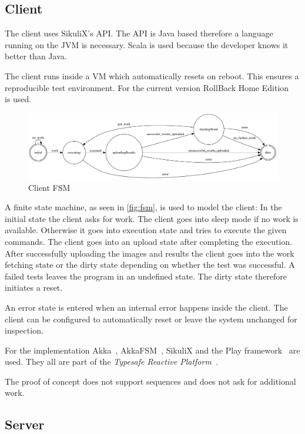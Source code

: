 \documentclass[a4paper,twocolumn,twoside]{article}
\begin{document}
\subsection{Client}
The client uses SikuliX's API.
The API is Java based therefore a language running on the JVM is necessary.
Scala is used because the developer knows it better than Java.

The client runs inside a VM which automatically resets on reboot.
This ensures a reproducible test environment.
For the current version RollBack Home Edition~\cite{RollBack} is used.
\begin{figure}
	\centering
	\includegraphics[width=1.0\linewidth]{../img/client_fsm}
	\caption{Client FSM}
	\label{fig:fsm}
\end{figure}
A finite state machine, as seen in \autoref{fig:fsm}, is used to model the client:
In the initial state the client asks for work.
The client goes into sleep mode if no work is available.
Otherwise it goes into execution state and tries to execute the given commands.
The client goes into an upload state after completing the execution.
After successfully uploading the images and results the client goes into the work fetching state or the dirty state depending on whether the test was successful.
A failed tests leaves the program in an undefined state.
The dirty state therefore initiates a reset.

An error state is entered when an internal error happens inside the client.
The client can be configured to automatically reset or leave the system unchanged for inspection.

For the implementation Akka~\cite{Akka}, AkkaFSM~\cite{AkkaFSM}, SikuliX and the Play framework~\cite{Play} are used.
They all are part of the \emph{Typesafe Reactive Platform}~\cite{TypesafeRP}.

The proof of concept does not support sequences and does not ask for additional work.

\subsection{Server}
\end{document}
